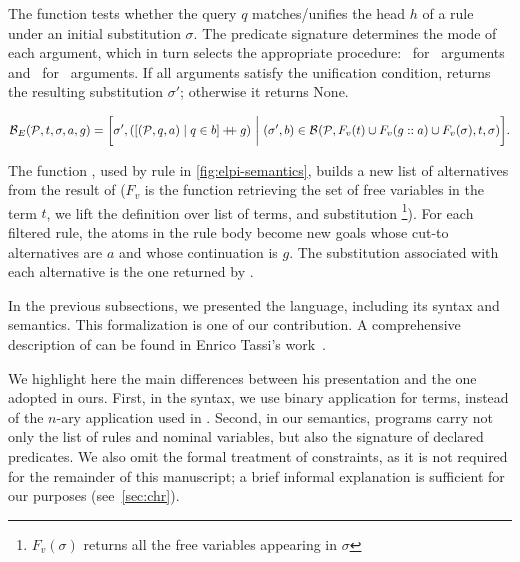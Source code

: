 The function \select tests whether the query $q$ matches/unifies the head $h$ of a rule
under an initial substitution $\sigma$. The predicate signature determines the
mode of each argument, which in turn selects the appropriate procedure:
\matching\ for \Einput\ arguments and \unify\ for \Eoutput\ arguments.
If all arguments satisfy the unification condition, \select returns the resulting substitution
$\sigma'$; otherwise it returns None.

\begin{definition}

\[
\backchainE(\prog, t, \sigma, a, g) =
\bigg[
\sigma',
(
  [(\prog, q, a) \mid q \in b] \atsign g
)
\ \bigg|\ 
(\sigma', b) \in \backchain(\prog, F_v(t) \cup F_v(g::a) \cup F_v(\sigma), t, \sigma)
\bigg].
\]
\end{definition}

The function \backchainE, used by rule \runE[\backchain] in
\cref{fig:elpi-semantics}, builds a new list of alternatives from the result of
\backchain ($F_v$ is the function retrieving the set of free variables in %
the term $t$, we lift the definition over list of terms, and substitution%
\footnote{$F_v(\sigma)$ returns all the free variables
appearing in $\sigma$}).
For each filtered rule, the atoms in the rule body become new
goals whose cut-to alternatives are $a$ and whose continuation is $g$. The
substitution associated with each alternative is the one returned by
\backchain.


In the previous subsections, we presented the \elpi language, including its
syntax and semantics. This formalization is one of our contribution. A
comprehensive description of \elpi can be found in Enrico Tassi's work~\cite{hdr}.

We highlight here the main differences between his presentation and the one
adopted in ours. First, in the syntax, we use binary application for
terms, instead of the $n$-ary application used in \cite{hdr}. Second, in our
semantics, programs carry not only the list of rules and nominal variables, but
also the signature of declared predicates. We also omit the formal treatment of
constraints, as it is not required for the remainder of this manuscript; a brief
informal explanation is sufficient for our purposes (see~\cref{sec:chr}).

